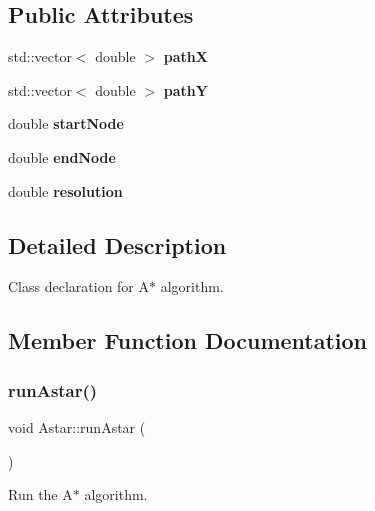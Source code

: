 \subsection*{Public Attributes}
\begin{DoxyCompactItemize}
\item 
\mbox{\label{class_astar_a1e45d708a217777c54edd4d4934993c2}} 
std\+::vector$<$ double $>$ {\bfseries pathX}
\item 
\mbox{\label{class_astar_a5fe1d01846af725d532ac808ae3ffa19}} 
std\+::vector$<$ double $>$ {\bfseries pathY}
\item 
\mbox{\label{class_astar_ac27743848e050dc98f6027bb5edecbfe}} 
double {\bfseries start\+Node}
\item 
\mbox{\label{class_astar_a24c3c2b1ac9fb1c416a76adbd9cdca74}} 
double {\bfseries end\+Node}
\item 
\mbox{\label{class_astar_a6d7af235277b296da37ef1d77c94b551}} 
double {\bfseries resolution}
\end{DoxyCompactItemize}


\subsection{Detailed Description}
Class declaration for A$\ast$ algorithm. 

\subsection{Member Function Documentation}
\mbox{\label{class_astar_aa0213700144005010364b7723edee3e7}} 
\subsubsection{\texorpdfstring{run\+Astar()}{runAstar()}}
{\footnotesize\ttfamily void Astar\+::run\+Astar (\begin{DoxyParamCaption}{ }\end{DoxyParamCaption})}



Run the A$\ast$ algorithm. 


